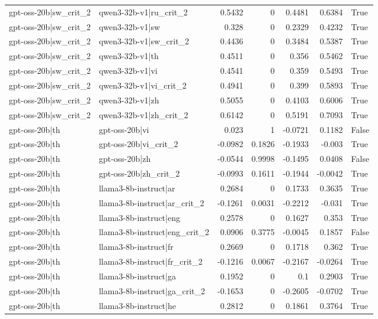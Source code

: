 \begin{table}
\begin{tabular}{l l r r r r l}
gpt-oss-20b|sw_crit_2 & qwen3-32b-v1|ru_crit_2 & 0.5432 & 0 & 0.4481 & 0.6384 & True \\
gpt-oss-20b|sw_crit_2 & qwen3-32b-v1|sw & 0.328 & 0 & 0.2329 & 0.4232 & True \\
gpt-oss-20b|sw_crit_2 & qwen3-32b-v1|sw_crit_2 & 0.4436 & 0 & 0.3484 & 0.5387 & True \\
gpt-oss-20b|sw_crit_2 & qwen3-32b-v1|th & 0.4511 & 0 & 0.356 & 0.5462 & True \\
gpt-oss-20b|sw_crit_2 & qwen3-32b-v1|vi & 0.4541 & 0 & 0.359 & 0.5493 & True \\
gpt-oss-20b|sw_crit_2 & qwen3-32b-v1|vi_crit_2 & 0.4941 & 0 & 0.399 & 0.5893 & True \\
gpt-oss-20b|sw_crit_2 & qwen3-32b-v1|zh & 0.5055 & 0 & 0.4103 & 0.6006 & True \\
gpt-oss-20b|sw_crit_2 & qwen3-32b-v1|zh_crit_2 & 0.6142 & 0 & 0.5191 & 0.7093 & True \\
gpt-oss-20b|th & gpt-oss-20b|vi & 0.023 & 1 & -0.0721 & 0.1182 & False \\
gpt-oss-20b|th & gpt-oss-20b|vi_crit_2 & -0.0982 & 0.1826 & -0.1933 & -0.003 & True \\
gpt-oss-20b|th & gpt-oss-20b|zh & -0.0544 & 0.9998 & -0.1495 & 0.0408 & False \\
gpt-oss-20b|th & gpt-oss-20b|zh_crit_2 & -0.0993 & 0.1611 & -0.1944 & -0.0042 & True \\
gpt-oss-20b|th & llama3-8b-instruct|ar & 0.2684 & 0 & 0.1733 & 0.3635 & True \\
gpt-oss-20b|th & llama3-8b-instruct|ar_crit_2 & -0.1261 & 0.0031 & -0.2212 & -0.031 & True \\
gpt-oss-20b|th & llama3-8b-instruct|eng & 0.2578 & 0 & 0.1627 & 0.353 & True \\
gpt-oss-20b|th & llama3-8b-instruct|eng_crit_2 & 0.0906 & 0.3775 & -0.0045 & 0.1857 & False \\
gpt-oss-20b|th & llama3-8b-instruct|fr & 0.2669 & 0 & 0.1718 & 0.362 & True \\
gpt-oss-20b|th & llama3-8b-instruct|fr_crit_2 & -0.1216 & 0.0067 & -0.2167 & -0.0264 & True \\
gpt-oss-20b|th & llama3-8b-instruct|ga & 0.1952 & 0 & 0.1 & 0.2903 & True \\
gpt-oss-20b|th & llama3-8b-instruct|ga_crit_2 & -0.1653 & 0 & -0.2605 & -0.0702 & True \\
gpt-oss-20b|th & llama3-8b-instruct|he & 0.2812 & 0 & 0.1861 & 0.3764 & True \\

\end{tabular}
\end{table}
